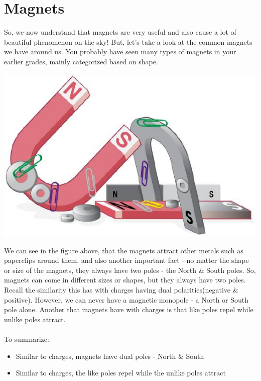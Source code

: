 \documentclass[9pt]{article}
\begin{document}
	\section*{Magnets}
	So, we now understand that magnets are very useful and also cause a lot of beautiful phenomenon on the sky! But, let's take a look at the common magnets we have around us. You probably have seen many types of magnets in your earlier grades, mainly categorized based on shape.
	\begin{center}
		\includegraphics[scale=0.5]{magnets}
	\end{center}
	We can see in the figure above, that the magnets attract other metals such as paperclips around them, and also another important fact - no matter the shape or size of the magnets, they always have two poles - the North \& South poles. So, magnets can come in different sizes or shapes, but they always have two poles. Recall the similarity this has with charges having dual polarities(negative \& positive). However, we can never have a magnetic monopole - a North or South pole alone. Another that magnets have with charges is that like poles repel while unlike poles attract. \\ \\ To summarize:
	\begin{itemize}
		\item Similar to charges, magnets have dual poles - North \& South
		\item Similar to charges, the like poles repel while the unlike poles attract
	\end{itemize}
\end{document}
